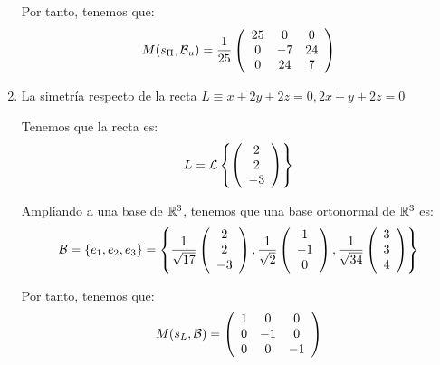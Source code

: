 \begin{ejercicio}
\begin{enumerate}
        Por tanto, tenemos que:
        \begin{equation*}
            M(s_{\Pi}, \mathcal{B}_u) = \frac{1}{25}\left(\begin{array}{ccc}
                     25 & 0 & 0 \\
                     0 & -7 & 24 \\
                     0 & 24 & 7
                \end{array}\right)
        \end{equation*}

        
        \item La simetría respecto de la recta $L\equiv x+2y+2z=0,2x+y+2z=0$

        Tenemos que la recta es:
        \begin{equation*}
            L = \mathcal{L}\left\{
            \left(\begin{array}{c}
                     2 \\ 2 \\ -3
                \end{array}\right)
            \right\}
        \end{equation*}

        Ampliando a una base de $\mathbb{R}^3$, tenemos que una base ortonormal de $\mathbb{R}^3$ es:
        \begin{equation*}
            \mathcal{B} = \{e_1, e_2, e_3\} = \left\{
                \frac{1}{\sqrt{17}}\left(\begin{array}{c}
                     2 \\ 2 \\ -3
                \end{array}\right),\frac{1}{\sqrt{2}}
                \left(\begin{array}{c}
                     1 \\ -1 \\ 0
                \end{array}\right),\frac{1}{\sqrt{34}}
                \left(\begin{array}{c}
                     3 \\ 3 \\ 4
                \end{array}\right)
            \right\}
        \end{equation*}

        Por tanto, tenemos que:
        \begin{equation*}
            M(s_{L}, \mathcal{B}) =\left(\begin{array}{ccc}
                     1 & 0 & 0 \\
                     0 & -1 & 0 \\
                     0 & 0 & -1
                \end{array}\right)
        \end{equation*}


\end{enumerate}
\end{ejercicio}
